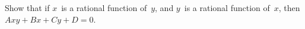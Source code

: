 Show that if $x$~is a rational function of~$y$, and $y$~is a rational function
of~$x$, then $Axy + Bx + Cy + D = 0$.


